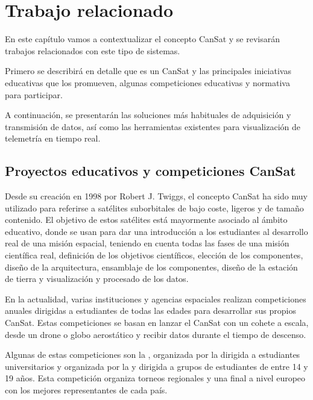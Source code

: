 \chapter{Trabajo relacionado}
\label{cap:trabajorRelacionado}
En este capítulo vamos a contextualizar el concepto CanSat y se revisarán trabajos relacionados con este tipo de sistemas.

Primero se describirá en detalle que es un CanSat y las principales iniciativas educativas que los promueven,
algunas competiciones educativas y normativa para participar.

A continuación, se presentarán las soluciones más habituales de adquisición y transmisión de datos, así como las herramientas existentes para visualización de telemetría en tiempo real.


\section{Proyectos educativos y competiciones CanSat}
Desde su creación en 1998 por Robert J. Twiggs, el concepto CanSat ha sido muy utilizado para referirse a satélites suborbitales de bajo coste,
ligeros y de tamaño contenido.
El objetivo de estos satélites está mayormente asociado al ámbito educativo, donde se usan para dar una introducción a los estudiantes al desarrollo real de una misión espacial,
teniendo en cuenta todas las fases de una misión científica real, definición de los objetivos científicos, elección de los componentes, diseño de la arquitectura, ensamblaje de los componentes,
diseño de la estación de tierra y visualización y procesado de los datos.

En la actualidad, varias instituciones y agencias espaciales realizan competiciones anuales dirigidas a estudiantes de todas las edades para desarrollar sus propios CanSat.
Estas competiciones se basan en lanzar el CanSat con un cohete a escala, desde un drone o globo aerostático y recibir datos durante el tiempo de descenso.

Algunas de estas competiciones son la \cite{cansatcompetition2025}, organizada por la \cite{american_astronautical_society2025} dirigida a estudiantes universitarios
y \cite{esa_cansat2025} organizada por la \cite{esa2025} y dirigida a grupos de estudiantes de entre 14 y 19 años.
Esta competición organiza torneos regionales y una final a nivel europeo con los mejores representantes de cada país.

